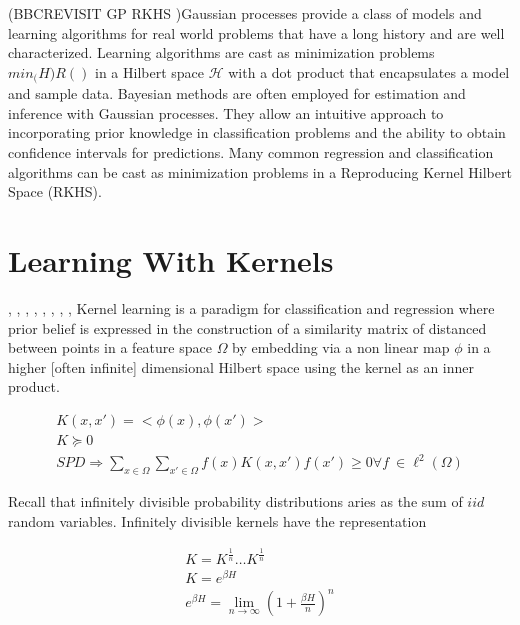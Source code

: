 (BBCREVISIT GP  RKHS )Gaussian processes provide a class of models and learning algorithms for real world problems that have a long history and are well characterized. Learning algorithms are cast as minimization problems $min_\mathcal(H) R() $ in a Hilbert space $ \mathcal{H}$ with a dot product that encapsulates a model and sample data.  Bayesian methods are often employed for estimation and inference with Gaussian processes. They allow an intuitive approach to incorporating prior knowledge in classification problems and the ability to obtain confidence intervals for predictions.  Many common regression and classification algorithms can be cast as minimization problems in a Reproducing Kernel Hilbert Space (RKHS).


\section{Learning With Kernels}
\cite{KLBurges98atutorial}, \cite{KLKeerthi99improvementsto}, \cite{KLProgramminglearningthe},
\cite{KLScholkopf00newsupport}, \cite{KLScholkopf00statisticallearning}, \cite{KLShevade99improvementsto},
\cite{KLTsang03distancemetric}, \cite{KLWeston00featureselection}, \cite{KLSchultz03learninga}
Kernel learning is a paradigm for classification and regression where prior belief is expressed in the construction of a similarity matrix of distanced between points in a feature space $\Omega$ by embedding via a non linear map $\phi$ in a higher [often infinite] dimensional Hilbert space using the kernel as an inner product.
\begin{center}\begin{eqnarray*}
  K(x,x')= <\phi(x),\phi(x')> \\
  K \succeq 0 \\
  SPD \Rightarrow \sum\limits_{x \in \Omega}^{}  \sum\limits_{x' \in \Omega}^{} f(x) K(x,x') f(x') \geq 0 \forall f\ \in \ell^2(\Omega)
\end{eqnarray*}\end{center}
Recall that infinitely divisible probability distributions aries as the sum of $iid$ random variables.  Infinitely divisible kernels have the representation
\begin{center}\begin{eqnarray*}
K=K^{\frac{1}{n}} \ldots K^{\frac{1}{n}} \\
K= e^{\beta H} \\
e^{\beta H} = \lim\limits_{n\rightarrow \infty} (1+ \frac{\beta H}{n} )^n
\end{eqnarray*}\end{center}
